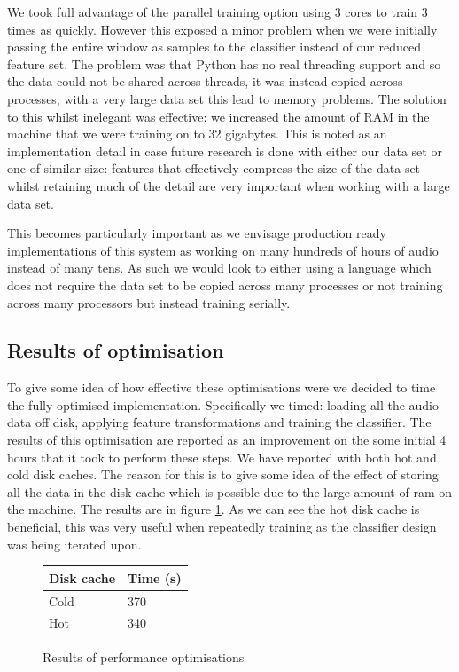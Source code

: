 \documentclass[ %
                    author={Sam Phippen},
                supervisor={Dr. Rafal Bogacz},
                     title={Real time voice activity detectors in noisy personal computing environments},
                  subtitle={},
                    degree={MEng},
                      year={2012} ]{thesis}
\begin{document}
We took full advantage of the parallel training option using 3 cores to train 3
times as quickly. However this exposed a minor problem when we were initially
passing the entire window as samples to the classifier instead of our reduced
feature set. The problem was that Python has no real threading support and so
the data could not be shared across threads, it was instead copied across
processes, with a very large data set this lead to memory problems. The
solution to this whilst inelegant was effective: we increased the amount of RAM
in the machine that we were training on to 32 gigabytes. This is noted as an
implementation detail in case future research is done with either our data set
or one of similar size: features that effectively compress the size of
the data set whilst retaining much of the detail are very important when
working with a large data set.

This becomes particularly important as we envisage production ready
implementations of this system as working on many hundreds of hours of audio
instead of many tens. As such we would look to either using a language which
does not require the data set to be copied across many processes or not
training across many processors but instead training serially.

\subsection{Results of optimisation}

To give some idea of how effective these optimisations were we decided to time
the fully optimised implementation. Specifically we timed: loading all the
audio data off disk, applying feature transformations and training the
classifier. The results of this optimisation are reported as an improvement on
the some initial 4 hours that it took to perform these steps. We have reported
with both hot and cold disk caches. The reason for this is to give some idea of
the effect of storing all the data in the disk cache which is possible due to
the large amount of ram on the machine. The results are in figure
\ref{table:optimisation-results}. As we can see the hot disk cache is
beneficial, this was very useful when repeatedly training as the classifier
design was being iterated upon.

\begin{figure}
    \begin{tabular}{|l|l|}
        Disk cache & Time (s) \\ \hline
        Cold & 370 \\
        Hot &  340 \\
    \end{tabular}
    \caption{Results of performance optimisations}

    \label{table:optimisation-results}
\end{figure}
\end{document}

